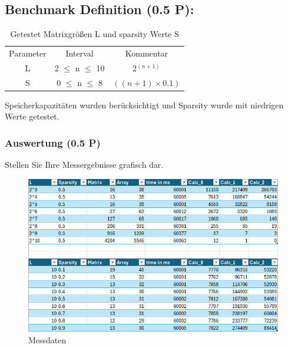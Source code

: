 \documentclass[11pt]{scrartcl}
\begin{document}
\subsection*{Benchmark Definition (0.5 P):}

\begin{table}[h]
	\centering
		\begin{center}
			\begin{tabular}{ c c c }
				Parameter & Interval & Kommentar\\
				L & 2 $\leq$ n $\leq$ 10 & 2$^{(n + 1)}$  \\
				S & 0 $\leq$ n $\leq$ 8 & $((n + 1) \times 0.1)$ \\                     
			\end{tabular}
			\end{center}
	\caption{Getestet Matrixgrößen L und sparsity Werte S}
	\label{tab:MatrixgrößenLUndSparsityWerteS}
\end{table}
Speicherkapazitäten wurden berücksichtigt und Sparsity wurde mit niedrigen Werte getestet.  

\subsubsection*{Auswertung (0.5 P)}

Stellen Sie Ihre Messergebnisse grafisch dar. 

\begin{figure}[H]
  \includegraphics[width=\linewidth]{Testdaten.png}
  \caption{Messdaten}
\end{figure}
\end{document}
